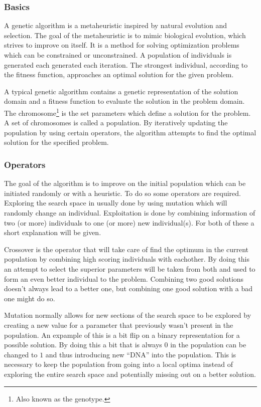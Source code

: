 \subsubsection{Basics}
A genetic algorithm is a metaheuristic inspired by natural evolution and selection.
The goal of the metaheuristic is to mimic biological evolution, which strives to improve on itself.
It is a method for solving optimization problems which can be constrained or unconstrained.
A population of individuals is generated each generated each iteration.
The strongest individual, according to the fitness function, approaches an optimal solution for the given problem.

A typical genetic algorithm contains a genetic representation of the solution domain and a fitness function to evaluate the solution in the problem domain.
The chromosome\footnote{Also known as the genotype.} is the set parameters which define a solution for the problem.
A set of chromosomes is called a population.
By iteratively updating the population by using certain operators, the algorithm attempts to find the optimal solution for the specified problem.

\subsubsection{Operators}
The goal of the algorithm is to improve on the initial population which can be initiated randomly or with a heuristic.
To do so some operators are required.
Exploring the search space in usually done by using mutation which will randomly change an individual.
Exploitation is done by combining information of two (or more) individuals to one (or more) new individual(s).
For both of these a short explanation will be given.

Crossover is the operator that will take care of find the optimum in the current population by combining high scoring individuals with eachother.
By doing this an attempt to select the superior parameters will be taken from both and used to form an even better individual to the problem.
Combining two good solutions doesn't always lead to a better one, but combining one good solution with a bad one might do so.

Mutation normally allows for new sections of the search space to be explored by creating a new value for a parameter that previously wasn't present in the population.
An expample of this is a bit flip on a binary representation for a possible solution.
By doing this a bit that is always $0$ in the population can be changed to $1$ and thus introducing new ``DNA'' into the population.
This is necessary to keep the population from going into a local optima instead of exploring the entire search space and potentially missing out on a better solution.

